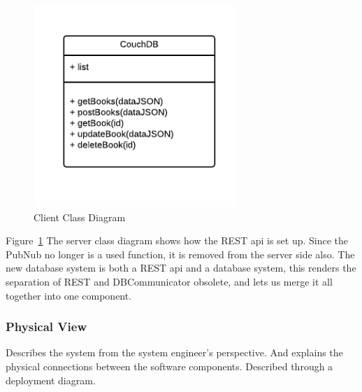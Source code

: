 \begin{figure}[h]
\centering
\includegraphics[width=3in]{image/architecture/s3/s3serverClassDiagram.png}
\caption{Client Class Diagram}
\label{figure:s3serverClassDiagram}
\end{figure}

Figure~\ref{figure:s3serverClassDiagram} The server class diagram shows how the REST api is set up. Since the PubNub no longer is a used function, it is removed from the server side also. The new database system is both a REST api and a database system, this renders the separation of REST and DBCommunicator obsolete, and lets us merge it all together into one component. 






\subsubsection{Physical View}
Describes the system from the system engineer's perspective. And explains the physical connections between the software components. Described through a deployment diagram. 

